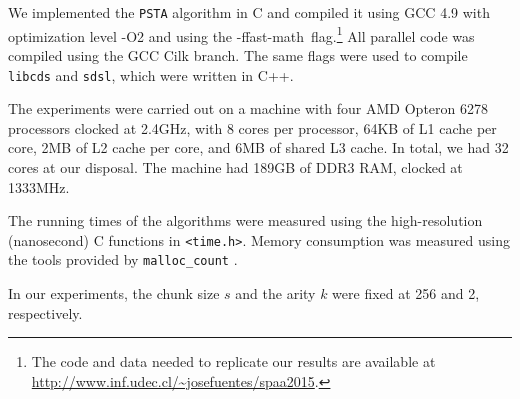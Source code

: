 We implemented the {\tt PSTA} algorithm in C and compiled it using GCC 4.9 with
optimization level -O2 and using the \mbox{-ffast-math flag}.\footnote{The code
  and data needed to replicate our results are available at
  \url{http://www.inf.udec.cl/~josefuentes/spaa2015}.}
All parallel code was compiled using the GCC Cilk branch.
The same flags were used to compile {\tt libcds} and {\tt sdsl}, which were
written in C++.

The experiments were carried out on a machine with four AMD
Opteron\texttrademark{} 6278 processors clocked at 2.4GHz,
with 8 cores per processor, 64KB of L1 cache per core, 2MB of L2 cache per core,
and 6MB of shared L3 cache.
In total, we had 32 cores at our disposal.
The machine had 189GB of DDR3 RAM, clocked at 1333MHz.

The running times of the algorithms were measured using
the high-resolution (nanosecond) C functions in {\tt <time.h>}.
Memory consumption was measured using the tools provided by
{\tt malloc\_count} \cite{malloc-count}.

In our experiments, the chunk size $s$ and the arity $k$ were fixed at 256 and
2, respectively.
